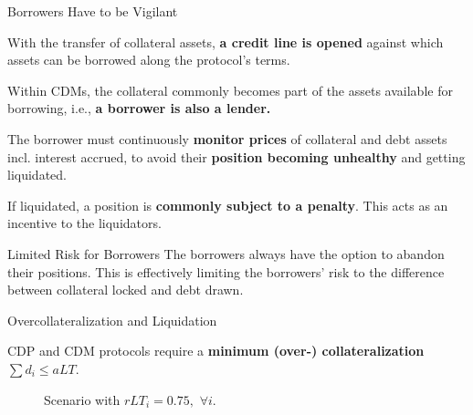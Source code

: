 \documentclass[handout]{beamer}
\begin{document}
\begin{frame}{Borrowers Have to be Vigilant}

With the transfer of collateral assets, \textbf{a credit line is opened }against which assets can be borrowed along the protocol’s terms.

\vspace{0.8 em}
Within CDMs, the collateral commonly becomes part of the assets available for borrowing, i.e., \textbf{a borrower is also a lender.}

 {
\vspace{0.8 em}
The borrower must continuously \textbf{monitor prices} of collateral and debt assets incl. interest accrued, to avoid their \textbf{position becoming unhealthy} and getting liquidated.

\vspace{0.8 em}
If liquidated, a position is \textbf{commonly subject to a penalty}. This acts as an incentive to the liquidators.
}

 {
\vspace{0.8 em}
\begin{keytakeaway}{Limited Risk for Borrowers}
	The borrowers always have the option to abandon their positions. This is effectively limiting the borrowers' risk to the difference between collateral locked and debt drawn.
\end{keytakeaway}
}
	
\end{frame}


\begin{frame}{Overcollateralization and Liquidation}

CDP and CDM protocols require a \textbf{minimum (over-) collateralization} $\sum d_i \leq aLT$.
\vspace{1em}

\begin{minipage}{0.6\textwidth}
	\vspace{1.5em}
	\begin{figure}[t]
		\centering
		\begin{tikzpicture}[scale=0.5, every node/.style={scale=0.8}]
			
		\end{tikzpicture}
		\caption{Scenario with $rLT_i = 0.75,$ $\forall i$.}
	\end{figure}
\end{minipage}
\begin{minipage}{0.38\textwidth}
	
	
	\vspace{1em}
\end{minipage}
	
\end{frame}
\end{document}
